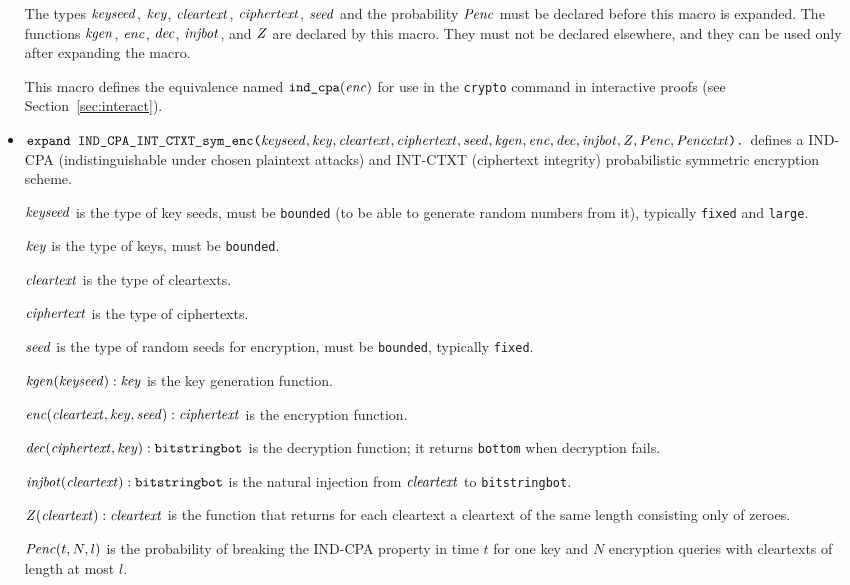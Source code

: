 \documentclass{article}
\begin{document}
\begin{itemize}
   The types $\mathit{keyseed}$, $\mathit{key}$, $\mathit{cleartext}$,
   $\mathit{ciphertext}$, $\mathit{seed}$ and the probability $\mathit{Penc}$ must
   be declared before this macro is expanded. The functions
   $\mathit{kgen}$, $\mathit{enc}$, $\mathit{dec}$, $\mathit{injbot}$, and $\mathit{Z}$ are declared by this
   macro. They must not be declared elsewhere, and they can be used
   only after expanding the macro.

   This macro defines the equivalence named $\texttt{ind\_cpa}(\mathit{enc})$
   for use in the \texttt{crypto} command in interactive proofs
   (see Section~\ref{sec:interact}).

\item $\texttt{expand IND\_CPA\_INT\_CTXT\_sym\_enc(}\mathit{keyseed}, \mathit{key},
  \mathit{cleartext}, \mathit{ciphertext}, \mathit{seed}, \mathit{kgen}, \mathit{enc},
  \mathit{dec}, \mathit{injbot}, \allowbreak \mathit{Z}, \allowbreak \mathit{Penc}, \allowbreak \mathit{Pencctxt}\texttt{).}$ defines a
  IND-CPA (indistinguishable under chosen plaintext attacks) and INT-CTXT (ciphertext integrity)
  probabilistic symmetric encryption scheme.

   $\mathit{keyseed}$ is the type of key seeds, must be \texttt{bounded} (to be able to generate random numbers from it), typically \texttt{fixed} and \texttt{large}.

   $\mathit{key}$ is the type of keys, must be \texttt{bounded}.

   $\mathit{cleartext}$ is the type of cleartexts.

   $\mathit{ciphertext}$ is the type of ciphertexts.

   $\mathit{seed}$ is the type of random seeds for encryption, must be \texttt{bounded}, typically \texttt{fixed}.

   $\mathit{kgen}(\mathit{keyseed}): \mathit{key}$ is the key generation function.

   $\mathit{enc}(\mathit{cleartext}, \mathit{key}, \mathit{seed}): \mathit{ciphertext}$ is the encryption function.

   $\mathit{dec}(\mathit{ciphertext}, \mathit{key}): \texttt{bitstringbot}$ is the
  decryption function; it returns \texttt{bottom} when decryption
  fails.

   $\mathit{injbot}(\mathit{cleartext}): \texttt{bitstringbot}$ is the natural
  injection from $\mathit{cleartext}$ to \texttt{bitstringbot}.

   $\mathit{Z}(\mathit{cleartext}): \mathit{cleartext}$ is the function that
  returns for each cleartext a cleartext of the same length consisting
  only of zeroes.

  $\mathit{Penc}(t, N, l)$ is the probability of breaking the IND-CPA
  property in time $t$ for one key and $N$ encryption queries with
  cleartexts of length at most $l$.


\end{itemize}
\end{document}
